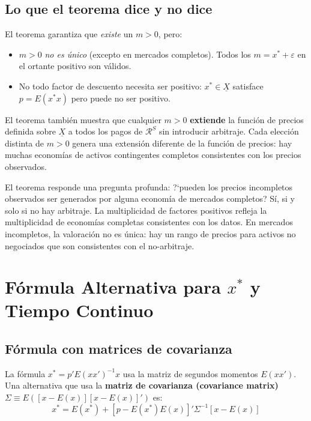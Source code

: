 \documentclass[12pt]{article}
\begin{document}
\subsection{Lo que el teorema dice y no dice}

El teorema garantiza que \emph{existe} un $m > 0$, pero:
\begin{itemize}
    \item $m > 0$ \emph{no es \'unico} (excepto en mercados completos). Todos los $m = x^* + \varepsilon$ en el ortante positivo son v\'alidos.
    \item No todo factor de descuento necesita ser positivo: $x^* \in \underline{X}$ satisface $p = E(x^*x)$ pero puede no ser positivo.
\end{itemize}

El teorema tambi\'en muestra que cualquier $m > 0$ \textbf{extiende} la funci\'on de precios definida sobre $\underline{X}$ a todos los pagos de $\mathcal{R}^S$ sin introducir arbitraje. Cada elecci\'on distinta de $m > 0$ genera una extensi\'on diferente de la funci\'on de precios: hay muchas econom\'ias de activos contingentes completos consistentes con los precios observados.

\begin{intuicion}
El teorema responde una pregunta profunda: ?`pueden los precios incompletos observados ser generados por alguna econom\'ia de mercados completos? S\'i, si y solo si no hay arbitraje. La multiplicidad de factores positivos refleja la multiplicidad de econom\'ias completas consistentes con los datos. En mercados incompletos, la valoraci\'on no es \'unica: hay un rango de precios para activos no negociados que son consistentes con el no-arbitraje.
\end{intuicion}

\section{F\'ormula Alternativa para $x^*$ y Tiempo Continuo}

\subsection{F\'ormula con matrices de covarianza}

La f\'ormula $x^* = p'E(xx')^{-1}x$ usa la matriz de segundos momentos $E(xx')$. Una alternativa que usa la \textbf{matriz de covarianza (covariance matrix)} $\Sigma \equiv E([x - E(x)][x-E(x)]')$ es:
\begin{equation}
    x^* = E(x^*) + [p - E(x^*)E(x)]' \Sigma^{-1} [x - E(x)] \label{eq:xstar_cov}
\end{equation}
\end{document}
